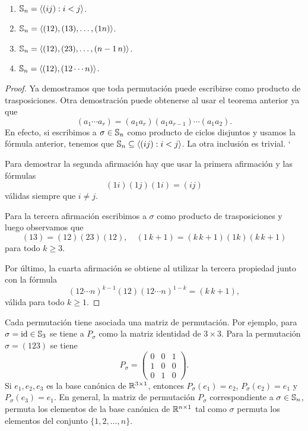 \begin{corollary}\
	\begin{enumerate}
		\item $\mathbb{S}_n=\langle (ij):i<j\rangle$. 
		\item $\mathbb{S}_n=\langle (12),(13),\dots,(1n)\rangle$.
		\item $\mathbb{S}_n=\langle (12),(23),\dots,(n-1\,n)\rangle$.
		\item $\mathbb{S}_n=\langle (12),(12\cdots n)\rangle$.
	\end{enumerate}
\end{corollary}

\begin{proof}
	Ya demostramos que toda permutación puede escribirse como producto de trasposiciones. Otra demostración puede obtenerse al usar el teorema anterior ya que 
	\[
	(a_1\cdots a_r)=(a_1a_r)(a_1a_{r-1})\cdots(a_1a_2).
	\]
	En efecto, si escribimos a $\sigma\in\mathbb{S}_n$ como producto de ciclos disjuntos y usamos la fórmula anterior, tenemos que $\mathbb{S}_n\subseteq\langle (ij):i<j\rangle$. La otra inclusión es trivial. ` 
	
	Para demostrar la segunda afirmación hay que usar la primera afirmación y las fórmulas
	\[
	(1i)(1j)(1i)=(ij)
	\] 
	válidas siempre que $i\ne j$. 
	
	Para la tercera afirmación escribimos a $\sigma$ como producto de trasposiciones y luego observamos que 
	\[
	(13)=(12)(23)(12),\quad
	(1\,k+1)=(k\,k+1)(1k)(k\,k+1)
	\]
	para todo $k\geq3$. 
	
	Por último, la cuarta afirmación se obtiene al utilizar la tercera propiedad junto con la fórmula
	\[
	(12\cdots n)^{k-1}(12)(12\cdots n)^{1-k}=(k\,k+1),
	\]
	válida para todo $k\geq1$. 
\end{proof}

Cada permutación tiene asociada una matriz de permutación. Por ejemplo, para $\sigma=\operatorname{id}\in\mathbb{S}_3$ se tiene a $P_\sigma$ como la matriz identidad de $3\times 3$. Para la permutación $\sigma=(123)$ se tiene 
\[
P_\sigma=\begin{pmatrix}0&0&1\\1&0&0\\0&1&0\end{pmatrix}.
\]
Si $e_1,e_2,e_3$ es la base canónica de $\mathbb{R}^{3\times1}$, entonces $P_{\sigma}(e_1)=e_2$, $P_{\sigma}(e_2)=e_1$ y $P_{\sigma}(e_3)=e_1$. En general, la matriz de permutación $P_\sigma$ correspondiente a $\sigma\in\mathbb{S}_n$, permuta los elementos de la base canónica de $\mathbb{R}^{n\times1}$ tal como $\sigma$ permuta los elementos del conjunto $\{1,2,\dots,n\}$.  

